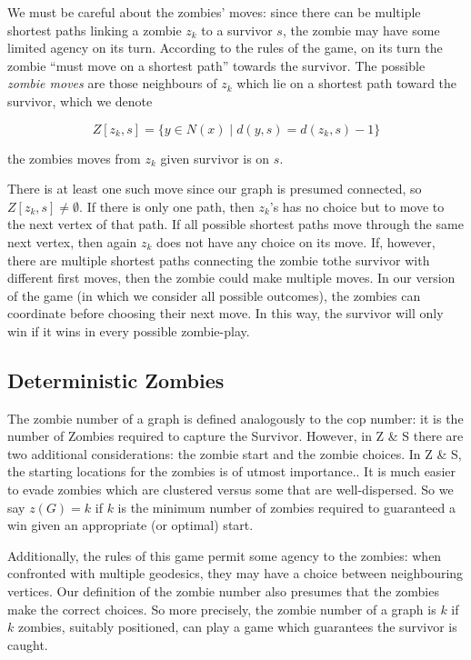 We must be careful about the zombies' moves: since there can be multiple shortest paths linking a zombie $z_k$ to a survivor $s$, the zombie may have some limited agency on its turn. According to the rules of the game, on its turn the zombie
``must move on a shortest path'' towards the survivor. The possible \textit{zombie moves}
are those neighbours of $z_k$ which lie on a shortest path toward the survivor, which we denote

\[ Z[z_k, s] = \{ y \in N(x) \mid d(y, s) = d(z_k, s) - 1 \} \]

the zombies moves from $z_k$ given survivor is on $s$.

There is at least one such move since our graph is presumed connected,
so $Z[z_k,s] \neq \emptyset$. If there is only one path, then $z_k$'s has no choice but to move to the next vertex of that path. If all possible shortest paths move through the same next vertex, then again $z_k$ does not have any choice on its move. If, however, there are multiple shortest paths connecting the zombie tothe survivor with different first moves, then the zombie could make multiple moves. In our version of the game (in which we consider all possible outcomes), the zombies can coordinate before choosing their next move. In this way, the survivor will only win if it wins in every possible zombie-play.

\subsection{Deterministic Zombies}

The zombie number of a graph is defined analogously to the cop number: it is the number of Zombies
required to capture the Survivor. However, in Z \& S there are two additional considerations:
the zombie start and the zombie choices.
In Z \& S, the starting locations for the zombies is of utmost importance..
It is much easier to evade zombies which are clustered versus some
that are well-dispersed. So we say $z(G) = k$ if $k$ is the minimum number of
zombies required to guaranteed a win given an appropriate (or optimal) start.

Additionally, the rules of this game permit
some agency to the zombies: when confronted with multiple geodesics, they may have
a choice between neighbouring vertices. Our definition of the zombie number also presumes that
the zombies make the correct choices. So more precisely, the zombie number of a
graph is $k$ if $k$ zombies, suitably positioned, can play a game which guarantees the survivor
is caught.

